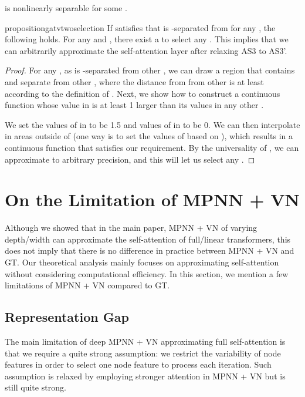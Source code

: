 \documentclass[nohyperref]{article}
\theoremstyle{plain}
\newenvironment{customAS}[1]
  {\renewcommand\theinnercustomAS{#1}\innercustomAS}
  {\endinnercustomAS}
\theoremstyle{definition}
\theoremstyle{remark}
\begin{document}
\begin{customAS}{3'}
\label{AS-4} 
 is  nonlinearly separable for some . 
\end{customAS}

\begin{restatable}{proposition}{gatvtwoselection}
\label{prop:gat-v2-selection}
If  satisfies that  is -separated from  for any , the following holds. For any  and , there exist a  to select any . This implies that we can arbitrarily approximate the self-attention layer  after relaxing AS3 to AS3'. 
\end{restatable}
\begin{proof}
For any , as  is -separated from other , we can draw a region  that contains  and separate  from other , where the distance from  from other  is at least  according to the definition of . Next, we show how to construct a continuous function  whose value in  is at least 1 larger than its values in any other   . 



We set the values of  in  to be 1.5 and values of  in  to be 0. We can then interpolate  in areas outside of  (one way is to set the values of  based on ), which results in a continuous function that satisfies our requirement.   
By the universality of , we can approximate  to arbitrary precision, and this will let us select any . 
\end{proof}



















\section{On the Limitation of MPNN + VN}
\label{sec:limitation-of-approximate-transformer}
Although we showed that in the main paper, MPNN + VN of varying depth/width can approximate the self-attention of full/linear transformers, this does not imply that there is no difference in practice between MPNN + VN and GT. Our theoretical analysis mainly focuses on approximating self-attention without considering computational efficiency. In this section, we mention a few limitations of MPNN + VN compared to GT.  

\subsection{Representation Gap}
The main limitation of deep MPNN + VN approximating full self-attention is that we require a quite strong assumption: we restrict the variability of node features in order to select one node feature to process each iteration. Such assumption is relaxed by employing stronger attention in MPNN + VN but is still quite strong. 
\end{document}
